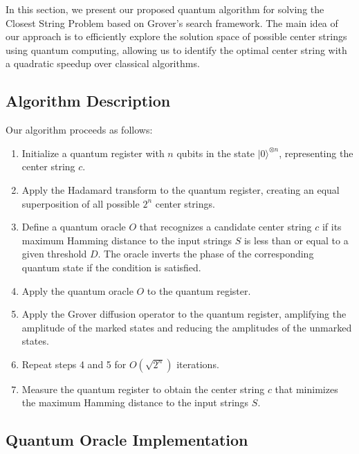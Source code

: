 In this section, we present our proposed quantum algorithm for solving the Closest String Problem based on Grover's search framework. The main idea of our approach is to efficiently explore the solution space of possible center strings using quantum computing, allowing us to identify the optimal center string with a quadratic speedup over classical algorithms.

\subsection{Algorithm Description}

Our algorithm proceeds as follows:

\begin{enumerate}
  \item Initialize a quantum register with $n$ qubits in the state $|0\rangle^{\otimes n}$, representing the center string $c$.

  \item Apply the Hadamard transform to the quantum register, creating an equal superposition of all possible $2^n$ center strings.

  \item Define a quantum oracle $O$ that recognizes a candidate center string $c$ if its maximum Hamming distance to the input strings $S$ is less than or equal to a given threshold $D$. The oracle inverts the phase of the corresponding quantum state if the condition is satisfied.

  \item Apply the quantum oracle $O$ to the quantum register.

  \item Apply the Grover diffusion operator to the quantum register, amplifying the amplitude of the marked states and reducing the amplitudes of the unmarked states.

  \item Repeat steps 4 and 5 for $O(\sqrt{2^n})$ iterations.

  \item Measure the quantum register to obtain the center string $c$ that minimizes the maximum Hamming distance to the input strings $S$.
\end{enumerate}

\subsection{Quantum Oracle Implementation}

